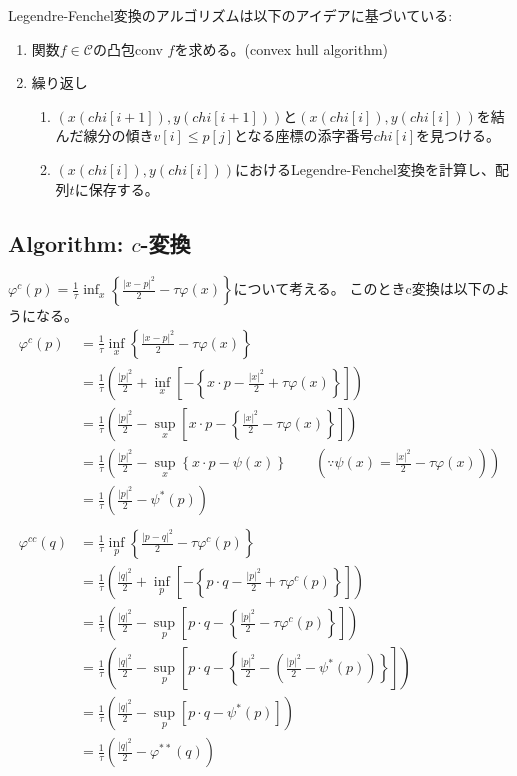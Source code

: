Legendre-Fenchel変換のアルゴリズムは以下のアイデアに基づいている:
\begin{enumerate}
    \item 関数$f \in \mathcal{C}$の凸包conv $f$を求める。(convex hull algorithm)
    \item 繰り返し
    \begin{enumerate}
        \item $(x(chi[i+1]), y(chi[i+1]))$と$(x(chi[i]), y(chi[i]))$を結んだ線分の傾き$v[i] \le p[j]$となる座標の添字番号$chi[i]$を見つける。
        \item $(x(chi[i]), y(chi[i]))$におけるLegendre-Fenchel変換を計算し、配列$t$に保存する。
    \end{enumerate}
\end{enumerate}

\subsection{Algorithm: $c$-変換}
\label{sect:al_c-tra}
$\varphi^c(p) = \frac{1}{\tau}\inf_x\left\{\frac{|x-p|^2}{2} - \tau\varphi(x)\right\}$について考える。
このときc変換は以下のようになる。
\begin{align*}
    \varphi^c(p) &= \frac{1}{\tau} \inf_x\left\{\frac{|x-p|^2}{2} - \tau \varphi(x)\right\}\\
              &= \frac{1}{\tau}  \left(\frac{|p|^2}{2} + \inf_x\left[- \left\{x \cdot p - \frac{|x|^2}{2} + \tau\varphi(x) \right\}\right]\right)\\
              &= \frac{1}{\tau}  \left(\frac{|p|^2}{2} - \sup_x\left[x \cdot p - \left\{\frac{|x|^2}{2} - \tau\varphi(x)\right\}\right]\right)\\
              &= \frac{1}{\tau}  \left(\frac{|p|^2}{2} - \sup_x\left\{x \cdot p - \psi(x)\right\} \qquad (\because \psi(x) = \frac{|x|^2}{2} - \tau\varphi(x))\right)\\
              &= \frac{1}{\tau}  \left(\frac{|p|^2}{2} - \psi^*(p)\right)\\
    \\
    \varphi^{cc}(q) 
              &= \frac{1}{\tau} \inf_p\left\{\frac{|p-q|^2}{2} - \tau \varphi^c(p)\right\}\\
              &= \frac{1}{\tau}\left(\frac{|q|^2}{2} + \inf_p\left[- \left\{p \cdot q - \frac{|p|^2}{2} + \tau\varphi^c(p) \right\}\right]\right)\\
              &= \frac{1}{\tau}\left(\frac{|q|^2}{2} - \sup_p\left[p \cdot q - \left\{\frac{|p|^2}{2} - \tau\varphi^c(p)\right\}\right]\right)\\
              &= \frac{1}{\tau}\left(\frac{|q|^2}{2} - \sup_p\left[p \cdot q - \left\{\frac{|p|^2}{2} - \left(\frac{|p|^2}{2} - \psi^*(p)\right)\right\}\right]\right)\\
              &= \frac{1}{\tau}\left(\frac{|q|^2}{2} - \sup_p\left[p \cdot q - \psi^*(p)\right]\right) \\
              &= \frac{1}{\tau}\left(\frac{|q|^2}{2} - \varphi^{**}(q)\right)
\end{align*}

